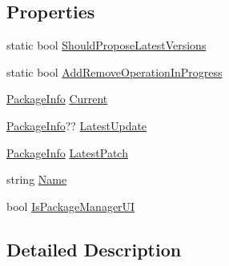 \subsection*{Properties}
\begin{DoxyCompactItemize}
\item 
static bool \mbox{\hyperlink{class_unity_editor_1_1_package_manager_1_1_u_i_1_1_package_ab997af9e3e2f5d8dbeb5c8cff8d4bec9}{Should\+Propose\+Latest\+Versions}}
\item 
static bool \mbox{\hyperlink{class_unity_editor_1_1_package_manager_1_1_u_i_1_1_package_a4b61acd81bacd398c6022e75cf33811a}{Add\+Remove\+Operation\+In\+Progress}}
\item 
\mbox{\hyperlink{class_unity_editor_1_1_package_manager_1_1_u_i_1_1_package_info}{Package\+Info}} \mbox{\hyperlink{class_unity_editor_1_1_package_manager_1_1_u_i_1_1_package_ac9a3a0581e85149b7e0a614b9f3de3f6}{Current}}
\item 
\mbox{\hyperlink{class_unity_editor_1_1_package_manager_1_1_u_i_1_1_package_info}{Package\+Info}}?? \mbox{\hyperlink{class_unity_editor_1_1_package_manager_1_1_u_i_1_1_package_a0a16f0854f348cea456abe0983590de3}{Latest\+Update}}
\item 
\mbox{\hyperlink{class_unity_editor_1_1_package_manager_1_1_u_i_1_1_package_info}{Package\+Info}} \mbox{\hyperlink{class_unity_editor_1_1_package_manager_1_1_u_i_1_1_package_abe3e3394cd7310123c5b4b885740d274}{Latest\+Patch}}
\item 
string \mbox{\hyperlink{class_unity_editor_1_1_package_manager_1_1_u_i_1_1_package_a1044e19763ce3d709ee4547b975a1472}{Name}}
\item 
bool \mbox{\hyperlink{class_unity_editor_1_1_package_manager_1_1_u_i_1_1_package_ab837ed795bd116a8f53fb33928a86c5b}{Is\+Package\+Manager\+UI}}
\end{DoxyCompactItemize}


\subsection{Detailed Description}


